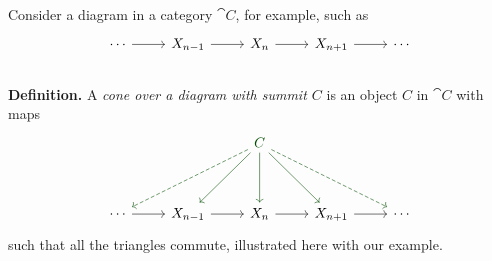 \begin{attempt-definition}\label{conlim}
Consider a diagram in a category $\cat{C}$, for example, such as
\[\begin{tikzcd}
\cdots \arrow[r] & X_{n-1} \arrow[r] & X_n \arrow[r] & X_{n+1} \arrow[r] & \cdots
\end{tikzcd}\]
\\
\textbf{Definition.} A \emph{cone over a diagram with summit $C$} is an object $C$ in $\cat{C}$  with maps
\[\begin{tikzcd}[row sep=huge]
                 &                   & {\color{darkgreen}C} \arrow[d,darkgreen] \arrow[ld, darkgreen] \arrow[lld, dashed, darkgreen] \arrow[rd, darkgreen] \arrow[rrd, dashed, darkgreen] &                   &        \\
\cdots \arrow[r] & X_{n-1} \arrow[r] & X_n \arrow[r]                                                             & X_{n+1} \arrow[r] & \cdots
\end{tikzcd}\]
such that all the triangles commute, illustrated here with our example.


\end{attempt-definition}
